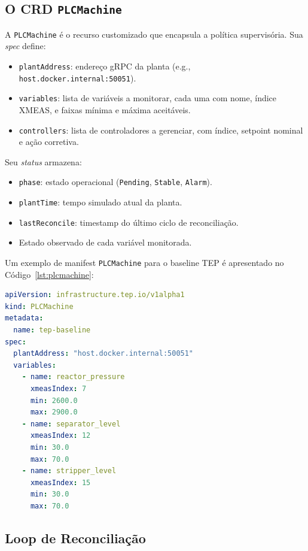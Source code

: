 \subsection{O CRD \texttt{PLCMachine}}

A \texttt{PLCMachine} é o recurso customizado que encapsula a política supervisória. Sua \textit{spec} define:

\begin{itemize}
  \item \texttt{plantAddress}: endereço gRPC da planta (e.g., \texttt{host.docker.internal:50051}).
  \item \texttt{variables}: lista de variáveis a monitorar, cada uma com nome, índice XMEAS, e faixas mínima e máxima aceitáveis.
  \item \texttt{controllers}: lista de controladores a gerenciar, com índice, setpoint nominal e ação corretiva.
\end{itemize}

Seu \textit{status} armazena:

\begin{itemize}
  \item \texttt{phase}: estado operacional (\texttt{Pending}, \texttt{Stable}, \texttt{Alarm}).
  \item \texttt{plantTime}: tempo simulado atual da planta.
  \item \texttt{lastReconcile}: timestamp do último ciclo de reconciliação.
  \item Estado observado de cada variável monitorada.
\end{itemize}

Um exemplo de manifest \texttt{PLCMachine} para o baseline TEP é apresentado no Código~\ref{lst:plcmachine}:

\begin{lstlisting}[language=yaml, float=htbp, caption={Manifest \texttt{PLCMachine} para o baseline TEP}, label={lst:plcmachine}]
apiVersion: infrastructure.tep.io/v1alpha1
kind: PLCMachine
metadata:
  name: tep-baseline
spec:
  plantAddress: "host.docker.internal:50051"
  variables:
    - name: reactor_pressure
      xmeasIndex: 7
      min: 2600.0
      max: 2900.0
    - name: separator_level
      xmeasIndex: 12
      min: 30.0
      max: 70.0
    - name: stripper_level
      xmeasIndex: 15
      min: 30.0
      max: 70.0
\end{lstlisting}

\subsection{Loop de Reconciliação}

